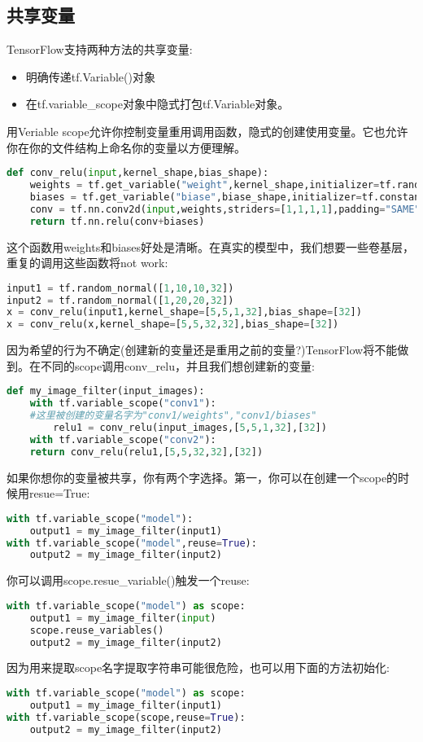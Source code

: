 \subsection{共享变量}
TensorFlow支持两种方法的共享变量:
\begin{itemize}
	\item 明确传递tf.Variable()对象
	\item 在tf.variable\_scope对象中隐式打包tf.Variable对象。
\end{itemize}
用Veriable scope允许你控制变量重用调用函数，隐式的创建使用变量。它也允许你在你的文件结构上命名你的变量以方便理解。
\begin{lstlisting}[language=Python]
def conv_relu(input,kernel_shape,bias_shape):
    weights = tf.get_variable("weight",kernel_shape,initializer=tf.random_normal_initializer())
    biases = tf.get_variable("biase",biase_shape,initializer=tf.constant_initializer(0.0))
    conv = tf.nn.conv2d(input,weights,striders=[1,1,1,1],padding="SAME")
    return tf.nn.relu(conv+biases)
\end{lstlisting}
这个函数用weights和biases好处是清晰。在真实的模型中，我们想要一些卷基层，重复的调用这些函数将not work:
\begin{lstlisting}[language=Python]
input1 = tf.random_normal([1,10,10,32])
input2 = tf.random_normal([1,20,20,32])
x = conv_relu(input1,kernel_shape=[5,5,1,32],bias_shape=[32])
x = conv_relu(x,kernel_shape=[5,5,32,32],bias_shape=[32])
\end{lstlisting}
因为希望的行为不确定(创建新的变量还是重用之前的变量?)TensorFlow将不能做到。在不同的scope调用conv\_relu，并且我们想创建新的变量:
\begin{lstlisting}[language=Python]
def my_image_filter(input_images):
    with tf.variable_scope("conv1"):
    #这里被创建的变量名字为"conv1/weights","conv1/biases"
        relu1 = conv_relu(input_images,[5,5,1,32],[32])
    with tf.variable_scope("conv2"):
	return conv_relu(relu1,[5,5,32,32],[32])
\end{lstlisting}
如果你想你的变量被共享，你有两个字选择。第一，你可以在创建一个scope的时候用resue=True:
\begin{lstlisting}[language=Python]
with tf.variable_scope("model"):
    output1 = my_image_filter(input1)
with tf.variable_scope("model",reuse=True):
    output2 = my_image_filter(input2)
\end{lstlisting}
你可以调用scope.resue\_variable()触发一个reuse:
\begin{lstlisting}[language=Python]
with tf.variable_scope("model") as scope:
    output1 = my_image_filter(input)
    scope.reuse_variables()
    output2 = my_image_filter(input2)
\end{lstlisting}
因为用来提取scope名字提取字符串可能很危险，也可以用下面的方法初始化:
\begin{lstlisting}[language=Python]
with tf.variable_scope("model") as scope:
    output1 = my_image_filter(input1)
with tf.variable_scope(scope,reuse=True):
    output2 = my_image_filter(input2)
\end{lstlisting}
